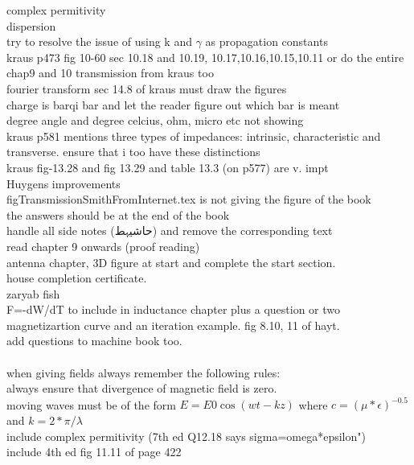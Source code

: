 \begin{otherlanguage}{english}
complex permitivity\\
dispersion\\
try to resolve the issue of using k and $\gamma$ as propagation constants\\
kraus p473 fig 10-60 sec 10.18 and 10.19, 10.17,10.16,10.15,10.11 or do the entire chap9 and 10  transmission from kraus too\\
fourier transform sec 14.8 of kraus must draw the figures\\
charge is barqi bar and let the reader figure out which bar is meant\\
degree angle and degree celcius, ohm, micro etc not showing\\
kraus p581 mentions three types of impedances: intrinsic, characteristic and transverse. ensure that i too have these distinctions\\
kraus fig-13.28 and fig 13.29 and table 13.3 (on p577) are v. impt\\
Huygens improvements\\
figTransmissionSmithFromInternet.tex is not giving the figure of the book\\
the answers should be at the end of the book\\
handle all side notes (حاشیہط) and remove the corresponding text\\
read chapter 9 onwards (proof reading)\\
antenna chapter, 3D figure at start and complete the start section.\\
house completion certificate.\\
zaryab fish\\
F=-dW/dT to include in inductance chapter plus a question or two\\
magnetizartion curve and an iteration example. fig 8.10, 11 of hayt.\\
add questions to machine book too.\\
\\
when giving fields always remember the following rules:\\
always ensure that divergence of magnetic field is zero.\\
moving waves must be of the form $E=E0 \cos(wt-kz)$ where $c=(\mu*\epsilon)^{-0.5}$ and $k=2*\pi/\lambda$\\
include complex permitivity  (7th ed Q12.18 says sigma=omega*epsilon")\\
include 4th ed fig 11.11 of page 422
\end{otherlanguage}
